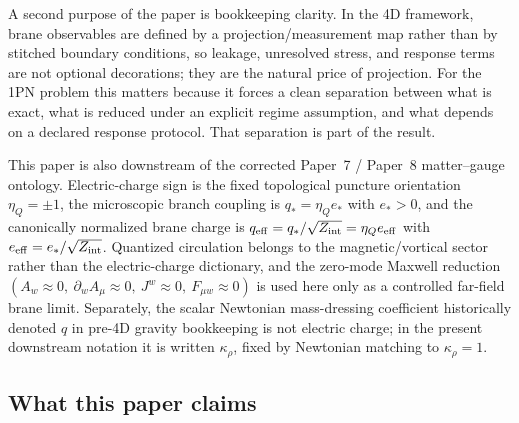 \documentclass[11pt]{article}
\newcommand{\krho}{\kappa_{\rho}}
\newcommand{\etaQ}{\eta_Q}
\newcommand{\qstar}{q_*}
\newcommand{\estar}{e_*}
\newcommand{\qeff}{q_{\mathrm{eff}}}
\newcommand{\eeff}{e_{\mathrm{eff}}}
\begin{document}
A second purpose of the paper is bookkeeping clarity. In the 4D framework, brane observables are defined by a projection/measurement map rather than by stitched boundary conditions, so leakage, unresolved stress, and response terms are not optional decorations; they are the natural price of projection. For the 1PN problem this matters because it forces a clean separation between what is exact, what is reduced under an explicit regime assumption, and what depends on a declared response protocol. That separation is part of the result.

This paper is also downstream of the corrected Paper~7 / Paper~8 matter--gauge ontology. Electric-charge sign is the fixed topological puncture orientation \(\etaQ=\pm1\), the microscopic branch coupling is \(\qstar=\etaQ\estar\) with \(\estar>0\), and the canonically normalized brane charge is \(\qeff=\qstar/\sqrt{Z_{\rm int}}=\etaQ\eeff\) with \(\eeff=\estar/\sqrt{Z_{\rm int}}\). Quantized circulation belongs to the magnetic/vortical sector rather than the electric-charge dictionary, and the zero-mode Maxwell reduction \((A_w\approx0,\ \partial_w A_\mu\approx0,\ J^w\approx0,\ F_{\mu w}\approx0)\) is used here only as a controlled far-field brane limit. Separately, the scalar Newtonian mass-dressing coefficient historically denoted \(q\) in pre-4D gravity bookkeeping is not electric charge; in the present downstream notation it is written \(\krho\), fixed by Newtonian matching to \(\krho=1\).

\subsection{What this paper claims}
\label{sec:claims}
\end{document}
